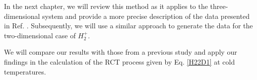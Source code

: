 In the next chapter, we will review this method as it applies to the three-dimensional system and provide a more precise description of the data presented in Ref. \cite{Bates1}. Subsequently, we will use a similar approach to generate the data for the two-dimensional case of \(H_{2}^{+}\). 

We will compare our results with those from a previous study \cite{Ref4} and apply our findings in the calculation of the RCT process given by Eq. \eqref{H22D1} at cold temperatures.



%








